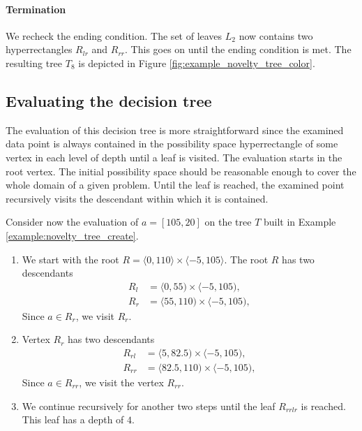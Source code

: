 \paragraph{Termination} We recheck the ending condition. The set of leaves $L_2$ now contains two hyperrectangles $R_{lr}$ and $R_{rr}$.
This goes on until the ending condition is met. The resulting tree $T_8$ is depicted in Figure \ref{fig:example_novelty_tree_color}.


\subsection{Evaluating the decision tree}
The evaluation of this decision tree is more straightforward since the examined data point is always contained in the possibility space hyperrectangle of some vertex in each level of depth until a leaf is visited.
The evaluation starts in the root vertex. The initial possibility space should be reasonable enough to cover the whole domain of a given problem. Until the leaf is reached, the examined point recursively visits the descendant within which it is contained.



\begin{example}
\label{ex:regular_point_evaluation_novelty}
    Consider now the evaluation of $a = [105,20]$ on the tree $T$ built in Example \ref{example:novelty_tree_create}.

\begin{enumerate}
    \item  We start with the root $R = \langle 0,110\rangle \times \langle -5, 105 \rangle$.
    The root $R$ has two descendants 
\begin{align*}
    R_l &= \langle 0,55) \times \langle -5, 105),\\
    R_r &= \langle 55,110) \times \langle -5, 105),
\end{align*}
Since $a \in R_r$, we visit $R_r$.
\item Vertex $R_r$ has two descendants
\begin{align*}
    R_{rl} &= \langle 5,82.5) \times \langle -5, 105),\\
    R_{rr} &= \langle 82.5,110) \times \langle -5, 105),
\end{align*}
Since $a \in R_{rr}$, we visit the vertex $R_{rr}$.
\item
We continue recursively for another two steps until the leaf $R_{rrlr}$ is reached. This leaf has a depth of $4$.

\end{enumerate}
   
\end{example}

